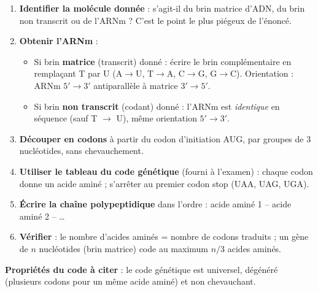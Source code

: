\documentclass[11pt]{article}
\newcommand{\cle}[1]{{\popxbold\color{popdark}#1}}
\begin{document}
\begin{methode}
\begin{enumerate}
\item \textbf{Identifier la molécule donnée} : s'agit-il du brin matrice d'ADN, du brin non transcrit ou de l'ARNm ? C'est le point le plus piégeux de l'énoncé.
\item \textbf{Obtenir l'ARNm} :
\begin{itemize}
\item Si brin \textbf{matrice} (transcrit) donné : écrire le brin complémentaire en remplaçant T par U (A$\rightarrow$U, T$\rightarrow$A, C$\rightarrow$G, G$\rightarrow$C). Orientation : ARNm $5' \rightarrow 3'$ antiparallèle à matrice $3' \rightarrow 5'$.
\item Si brin \textbf{non transcrit} (codant) donné : l'ARNm est \emph{identique} en séquence (sauf T $\rightarrow$ U), même orientation $5' \rightarrow 3'$.
\end{itemize}
\item \textbf{Découper en codons} à partir du codon d'initiation AUG, par groupes de 3 nucléotides, sans chevauchement.
\item \textbf{Utiliser le tableau du code génétique} (fourni à l'examen) : chaque codon donne un acide aminé ; s'arrêter au premier codon stop (UAA, UAG, UGA).
\item \textbf{Écrire la chaîne polypeptidique} dans l'ordre : acide aminé 1 -- acide aminé 2 -- \dots
\item \textbf{Vérifier} : le nombre d'acides aminés = nombre de codons traduits ; un gène de $n$ nucléotides (brin matrice) code au maximum $n/3$ acides aminés.
\end{enumerate}
\textbf{Propriétés du code à citer} : le code génétique est \cle{universel}, \cle{dégénéré} (plusieurs codons pour un même acide aminé) et \cle{non chevauchant}.
\end{methode}
\end{document}

